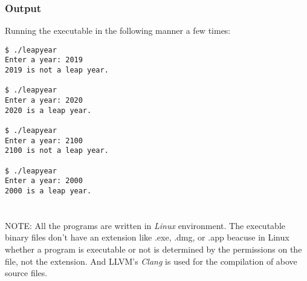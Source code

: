 \documentclass[12pt, letterpaper]{report}
\begin{document}
\subsubsection*{Output}
Running the executable in the following manner a few times:
\begin{verbatim}
$ ./leapyear
Enter a year: 2019
2019 is not a leap year.

$ ./leapyear
Enter a year: 2020
2020 is a leap year.

$ ./leapyear
Enter a year: 2100
2100 is not a leap year.

$ ./leapyear
Enter a year: 2000
2000 is a leap year.
\end{verbatim}

\section*{}
NOTE: All the programs are written in \emph{Linux} environment. The executable binary files don't have an extension like .exe, .dmg, or .app beacuse in Linux whether a program is executable or not is determined by the permissions on the file, not the extension. And LLVM's \emph{Clang} is used for the compilation of above source files.
\end{document}
